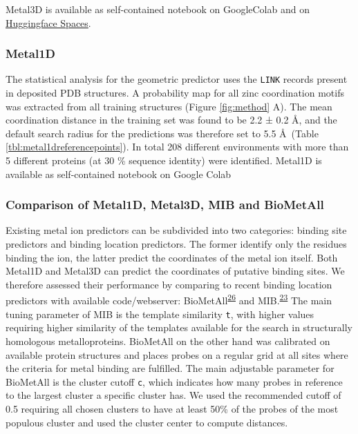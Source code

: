 \documentclass[  ASAPversion,
  ,
  9pt]{elife}
\begin{document}
Metal3D is available as self-contained notebook on GoogleColab and on \href{https://hf.space/simonduerr/metal3d}{Huggingface Spaces}.

\hypertarget{metal1d}{%
\subsubsection{Metal1D}\label{metal1d}}

The statistical analysis for the geometric predictor uses the \texttt{LINK} records present in deposited PDB structures. A probability map for all zinc coordination motifs was extracted from all training structures (Figure \ref{fig:method} A). The mean coordination distance in the training set was found to be 2.2 ± 0.2 \AA , and the default search radius for the predictions was therefore set to 5.5 \AA\, (Table \ref{tbl:metal1dreferencepoints}). In total 208 different environments with more than 5 different proteins (at 30 \% sequence identity) were identified.
Metal1D is available as self-contained notebook on Google Colab

\hypertarget{comparison-of-metal1d-metal3d-mib-and-biometall}{%
\subsubsection{Comparison of Metal1D, Metal3D, MIB and BioMetAll}\label{comparison-of-metal1d-metal3d-mib-and-biometall}}

Existing metal ion predictors can be subdivided into two categories: binding site predictors and binding location predictors. The former identify only the residues binding the ion, the latter predict the coordinates of the metal ion itself. Both Metal1D and Metal3D can predict the coordinates of putative binding sites. We therefore assessed their performance by comparing to recent binding location predictors with available code/webserver: BioMetAll\textsuperscript{\protect\hyperlink{ref-iHxzzTCG}{26}} and MIB.\textsuperscript{\protect\hyperlink{ref-1HMhB3vxM}{23}} The main tuning parameter of MIB is the template similarity \texttt{t}, with higher values requiring higher similarity of the templates available for the search in structurally homologous metalloproteins. BioMetAll on the other hand was calibrated on available protein structures and places probes on a regular grid at all sites where the criteria for metal binding are fulfilled. The main adjustable parameter for BioMetAll is the cluster cutoff \texttt{c}, which indicates how many probes in reference to the largest cluster a specific cluster has. We used the recommended cutoff of 0.5 requiring all chosen clusters to have at least 50\% of the probes of the most populous cluster and used the cluster center to compute distances.
\end{document}
